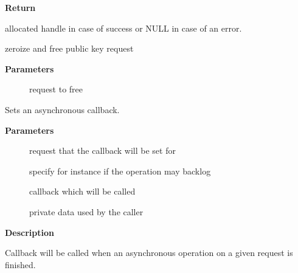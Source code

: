 \documentclass[a4paper,8pt,english]{sphinxmanual}
\begin{document}
\textbf{Return}

allocated handle in case of success or NULL in case of an error.

\begin{fulllineitems}
\label{crypto/api-akcipher:c.akcipher_request_free}
zeroize and free public key request

\end{fulllineitems}


\textbf{Parameters}
\begin{description}
\item[{}] \leavevmode
request to free

\end{description}

\begin{fulllineitems}
\label{crypto/api-akcipher:c.akcipher_request_set_callback}
Sets an asynchronous callback.

\end{fulllineitems}


\textbf{Parameters}
\begin{description}
\item[{}] \leavevmode
request that the callback will be set for

\item[{}] \leavevmode
specify for instance if the operation may backlog

\item[{}] \leavevmode
callback which will be called

\item[{}] \leavevmode
private data used by the caller

\end{description}

\textbf{Description}

Callback will be called when an asynchronous operation on a given
request is finished.
\end{document}
